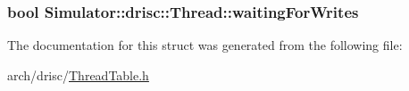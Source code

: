 \hypertarget{struct_simulator_1_1drisc_1_1_thread_a61342a620b15e75e994da0f550f5552a}{
\subsubsection[{waiting\+For\+Writes}]{\setlength{\rightskip}{0pt plus 5cm}bool Simulator\+::drisc\+::\+Thread\+::waiting\+For\+Writes}}\label{struct_simulator_1_1drisc_1_1_thread_a61342a620b15e75e994da0f550f5552a}


The documentation for this struct was generated from the following file\+:\begin{DoxyCompactItemize}
\item 
arch/drisc/\hyperlink{_thread_table_8h}{Thread\+Table.\+h}\end{DoxyCompactItemize}
